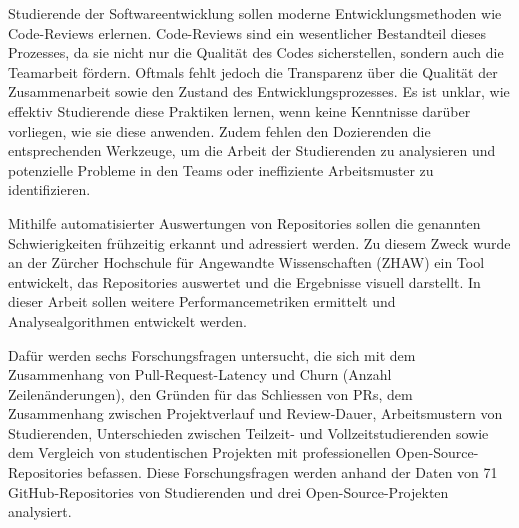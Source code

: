 \begin{extraAbstract}
\addchaptertocentry{\extraabstractname} %
Studierende der Softwareentwicklung sollen moderne Entwicklungsmethoden wie Code-Reviews erlernen. Code-Reviews sind ein wesentlicher Bestandteil dieses Prozesses, da sie nicht nur die Qualität des Codes sicherstellen, sondern auch die Teamarbeit fördern. Oftmals fehlt jedoch die Transparenz über die Qualität der Zusammenarbeit sowie den Zustand des Entwicklungsprozesses.
Es ist unklar, wie effektiv Studierende diese Praktiken lernen, wenn keine Kenntnisse darüber vorliegen, wie sie diese anwenden. Zudem fehlen den Dozierenden die entsprechenden Werkzeuge, um die Arbeit der Studierenden zu analysieren und potenzielle Probleme in den Teams oder ineffiziente Arbeitsmuster zu identifizieren.

Mithilfe automatisierter Auswertungen von Repositories sollen die genannten Schwierigkeiten frühzeitig erkannt und adressiert werden. Zu diesem Zweck wurde an der Zürcher Hochschule für Angewandte Wissenschaften (ZHAW) ein Tool entwickelt, das Repositories auswertet und die Ergebnisse visuell darstellt. In dieser Arbeit sollen weitere Performancemetriken ermittelt und Analysealgorithmen entwickelt werden.

Dafür werden sechs Forschungsfragen untersucht, die sich mit dem Zusammenhang von Pull-Request-Latency und Churn (Anzahl Zeilenänderungen), den Gründen für das Schliessen von PRs, dem Zusammenhang zwischen Projektverlauf und Review-Dauer, Arbeitsmustern von Studierenden, Unterschieden zwischen Teilzeit- und Vollzeitstudierenden sowie dem Vergleich von studentischen Projekten mit professionellen Open-Source-Repositories befassen. Diese Forschungsfragen werden anhand der Daten von 71 GitHub-Repositories von Studierenden und drei Open-Source-Projekten analysiert.


\end{extraAbstract}
